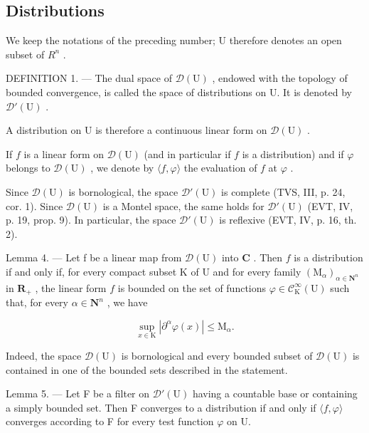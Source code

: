 \subsection{Distributions}

We keep the notations of the preceding number; U therefore denotes an open subset of \(R^{n}\) .

DEFINITION 1. --- The dual space of \(\mathcal{D}(\mathrm{U})\) , endowed with the topology of bounded convergence, is called the space of distributions on U. It is denoted by \(\mathcal{D}'(\mathrm{U})\) .

A distribution on U is therefore a continuous linear form on \(\mathcal{D}(\mathrm{U})\) .

If \(f\) is a linear form on \(\mathcal{D}(\mathrm{U})\) (and in particular if \(f\) is a distribution) and if \(\varphi\) belongs to \(\mathcal{D}(\mathrm{U})\) , we denote by \(\langle f, \varphi \rangle\) the evaluation of \(f\) at \(\varphi\) .

Since \(\mathcal{D}(\mathrm{U})\) is bornological, the space \(\mathcal{D}'(\mathrm{U})\) is complete (TVS, III, p. 24, cor. 1). Since \(\mathcal{D}(\mathrm{U})\) is a Montel space, the same holds for \(\mathcal{D}'(\mathrm{U})\) (EVT, IV, p. 19, prop. 9). In particular, the space \(\mathcal{D}'(\mathrm{U})\) is reflexive (EVT, IV, p. 16, th. 2).

Lemma 4. --- Let f be a linear map from \(\mathcal{D}(\mathrm{U})\) into \(\mathbf{C}\) . Then \(f\) is a distribution if and only if, for every compact subset \(\mathrm{K}\) of \(\mathrm{U}\) and for every family \((\mathrm{M}_{\alpha})_{\alpha \in \mathbf{N}^{n}}\) in \(\mathbf{R}_{+}\) , the linear form \(f\) is bounded on the set of functions \(\varphi \in \mathcal{C}_{\mathrm{K}}^{\infty}(\mathrm{U})\) such that, for every \(\alpha \in \mathbf{N}^{n}\) , we have

\[
\sup _ {x \in \mathrm{K}} | \partial^ {\alpha} \varphi (x) | \leqslant \mathrm{M} _ {\alpha}.
\]

Indeed, the space \(\mathcal{D}(\mathrm{U})\) is bornological and every bounded subset of \(\mathcal{D}(\mathrm{U})\) is contained in one of the bounded sets described in the statement.

Lemma 5. --- Let F be a filter on \(\mathcal{D}'(\mathrm{U})\) having a countable base or containing a simply bounded set. Then F converges to a distribution if and only if \(\langle f, \varphi \rangle\) converges according to F for every test function \(\varphi\) on U.


